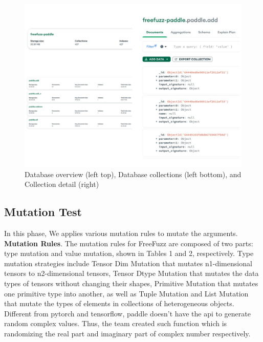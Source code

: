 \documentclass[sigconf]{acmart}
\begin{document}
   \begin{figure}[h]
    \centering
    \includegraphics[width=\linewidth]{3.png}
    \caption{Database overview (left top), Database collections (left bottom), and Collection detail (right)}
  \end{figure}
  
  \subsection{Mutation Test}

  In this phase, We applies various mutation rules to mutate the arguments.\cite{w1}
  \newline \textbf{Mutation Rules}. The mutation rules for FreeFuzz are composed
  of two parts: type mutation and value mutation, shown in Tables 1
  and 2, respectively. Type mutation strategies include Tensor Dim
  Mutation that mutates n1-dimensional tensors to n2-dimensional
  tensors, Tensor Dtype Mutation that mutates the data types of tensors without changing their shapes, Primitive Mutation that mutates
  one primitive type into another, as well as Tuple Mutation and List
  Mutation that mutate the types of elements in collections of heterogeneous objects.\cite{w1}
  \newline Different from pytorch and tensorflow, paddle doesn't have the api to generate random complex values. Thus, the team
  created such function which is randomizing the real part and imaginary part of complex number respectively.
 
\end{document}
